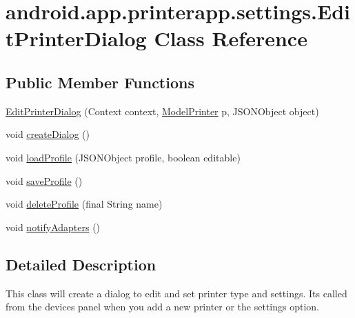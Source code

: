 \hypertarget{classandroid_1_1app_1_1printerapp_1_1settings_1_1_edit_printer_dialog}{}\section{android.\+app.\+printerapp.\+settings.\+Edit\+Printer\+Dialog Class Reference}
\label{classandroid_1_1app_1_1printerapp_1_1settings_1_1_edit_printer_dialog}
\subsection*{Public Member Functions}
\begin{DoxyCompactItemize}
\item 
\hyperlink{classandroid_1_1app_1_1printerapp_1_1settings_1_1_edit_printer_dialog_a975819544c747d74219bf328c6bb12ab}{Edit\+Printer\+Dialog} (Context context, \hyperlink{classandroid_1_1app_1_1printerapp_1_1model_1_1_model_printer}{Model\+Printer} p, J\+S\+O\+N\+Object object)
\item 
void \hyperlink{classandroid_1_1app_1_1printerapp_1_1settings_1_1_edit_printer_dialog_a79486f2ad472b3f8256fb21a7112c50f}{create\+Dialog} ()
\item 
void \hyperlink{classandroid_1_1app_1_1printerapp_1_1settings_1_1_edit_printer_dialog_aa069ebb52c4b106c45612db1c2bc4cc4}{load\+Profile} (J\+S\+O\+N\+Object profile, boolean editable)
\item 
void \hyperlink{classandroid_1_1app_1_1printerapp_1_1settings_1_1_edit_printer_dialog_ad00adaeeaaee1724c62efe72c613d722}{save\+Profile} ()
\item 
void \hyperlink{classandroid_1_1app_1_1printerapp_1_1settings_1_1_edit_printer_dialog_a921b4f28a30997ab387bdfb697b72127}{delete\+Profile} (final String name)
\item 
void \hyperlink{classandroid_1_1app_1_1printerapp_1_1settings_1_1_edit_printer_dialog_a27bf305fecb4c6e3e5d2e7007571142f}{notify\+Adapters} ()
\end{DoxyCompactItemize}


\subsection{Detailed Description}
This class will create a dialog to edit and set printer type and settings. It\textquotesingle{}s called from the devices panel when you add a new printer or the settings option. 

